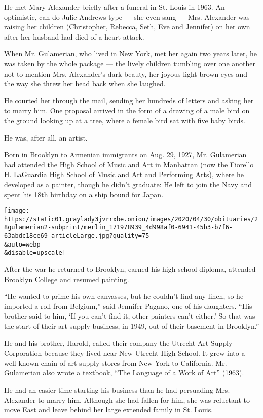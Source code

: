 He met Mary Alexander briefly after a funeral in St. Louis in 1963. An
optimistic, can-do Julie Andrews type --- she even sang --- Mrs.
Alexander was raising her children (Christopher, Rebecca, Seth, Eve and
Jennifer) on her own after her husband had died of a heart attack.

When Mr. Gulamerian, who lived in New York, met her again two years
later, he was taken by the whole package --- the lively children
tumbling over one another not to mention Mrs. Alexander's dark beauty,
her joyous light brown eyes and the way she threw her head back when she
laughed.

He courted her through the mail, sending her hundreds of letters and
asking her to marry him. One proposal arrived in the form of a drawing
of a male bird on the ground looking up at a tree, where a female bird
sat with five baby birds.

He was, after all, an artist.

Born in Brooklyn to Armenian immigrants on Aug. 29, 1927, Mr. Gulamerian
had attended the High School of Music and Art in Manhattan (now the
Fiorello H. LaGuardia High School of Music and Art and Performing Arts),
where he developed as a painter, though he didn't graduate: He left to
join the Navy and spent his 18th birthday on a ship bound for Japan.

\texttt{[image: https://static01.graylady3jvrrxbe.onion/images/2020/04/30/obituaries/28gulamerian2-subprint/merlin\_171978939\_4d998af0-6941-45b3-b7f6-63abdc18ce69-articleLarge.jpg?quality=75\\\&auto=webp\\\&disable=upscale]}

After the war he returned to Brooklyn, earned his high school diploma,
attended Brooklyn College and resumed painting.

``He wanted to prime his own canvasses, but he couldn't find any linen,
so he imported a roll from Belgium,'' said Jennifer Pagano, one of his
daughters. ``His brother said to him, `If you can't find it, other
painters can't either.' So that was the start of their art supply
business, in 1949, out of their basement in Brooklyn.''

He and his brother, Harold, called their company the Utrecht Art Supply
Corporation because they lived near New Utrecht High School. It grew
into a well-known chain of art supply stores from New York to
California. Mr. Gulamerian also wrote a textbook, ``The Language of a
Work of Art'' (1963).

He had an easier time starting his business than he had persuading Mrs.
Alexander to marry him. Although she had fallen for him, she was
reluctant to move East and leave behind her large extended family in St.
Louis.

